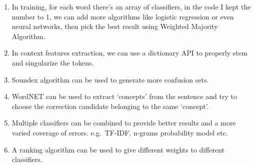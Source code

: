 \begin{enumerate}
\item In training, for each word there's an array of classifiers, in the code I kept
the number to 1, we can add more algorithms like logistic regression or even
neural networks, then pick the best result using Weighted Majority Algorithm.
\item In context features extraction, we can use a dictionary API to properly stem
and singularize the tokens.
\item Soundex algorithm can be used to generate more confusion sets.
\item WordNET can be used to extract ‘concepts’ from the sentence and try to choose the correction candidate belonging to the same `concept'.
\item Multiple classifiers can be combined to provide better results and a more varied coverage of errors. e.g.\ TF-IDF, n-grams probability model etc.
\item A ranking algorithm can be used to give different weights to different classifiers.
\end{enumerate}
